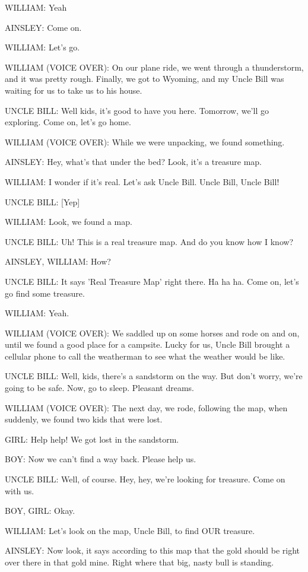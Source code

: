 WILLIAM:
Yeah

AINSLEY:
Come on.

WILLIAM:
Let's go.

WILLIAM (VOICE OVER):
On our plane ride, we went through a thunderstorm, and it was pretty rough.
Finally, we got to Wyoming, and my Uncle Bill was waiting for us to take us to his house.

UNCLE BILL:
Well kids, it's good to have you here.
Tomorrow, we'll go exploring. Come on, let's go home.

WILLIAM (VOICE OVER):
While we were unpacking, we found something.

AINSLEY:
Hey, what's that under the bed?
Look, it's a treasure map.

WILLIAM:
I wonder if it's real.
Let's ask Uncle Bill.
Uncle Bill, Uncle Bill!

UNCLE BILL:
[Yep]

WILLIAM:
Look, we found a map.

UNCLE BILL:
Uh! This is a real treasure map.
And do you know how I know?

AINSLEY, WILLIAM:
How?

UNCLE BILL:
It says 'Real Treasure Map' right there.
Ha ha ha.
Come on, let's go find some treasure.

WILLIAM:
Yeah.

WILLIAM (VOICE OVER):
We saddled up on some horses and rode on and on, until we found a good place for a campsite.
Lucky for us, Uncle Bill brought a cellular phone to call the weatherman to see what the weather would be like.

UNCLE BILL:
Well, kids, there's a sandstorm on the way.
But don't worry, we're going to be safe.
Now, go to sleep.
Pleasant dreams.

WILLIAM (VOICE OVER):
The next day, we rode, following the map, when suddenly, we found two kids that were lost.

GIRL:
Help help!
We got lost in the sandstorm.

BOY:
Now we can't find a way back.
Please help us.

UNCLE BILL:
Well, of course.
Hey, hey, we're looking for treasure.
Come on with us.

BOY, GIRL:
Okay.

WILLIAM:
Let's look on the map, Uncle Bill, to find OUR treasure.

AINSLEY:
Now look, it says according to this map that the gold should be right over there in that gold mine.
Right where that big, nasty bull is standing.

